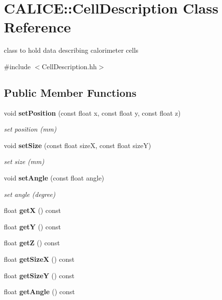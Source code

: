 \section{CALICE::CellDescription Class Reference}
\label{classCALICE_1_1CellDescription}


class to hold data describing calorimeter cells  


{\ttfamily \#include $<$CellDescription.hh$>$}\subsection*{Public Member Functions}
\begin{DoxyCompactItemize}
\item 
void {\bf setPosition} (const float x, const float y, const float z)
\begin{DoxyCompactList}\small\item\em set position (mm) \item\end{DoxyCompactList}\item 
void {\bf setSize} (const float sizeX, const float sizeY)
\begin{DoxyCompactList}\small\item\em set size (mm) \item\end{DoxyCompactList}\item 
void {\bf setAngle} (const float angle)
\begin{DoxyCompactList}\small\item\em set angle (degree) \item\end{DoxyCompactList}\item 
float {\bf getX} () const 
\item 
float {\bf getY} () const 
\item 
float {\bf getZ} () const 
\item 
float {\bf getSizeX} () const 
\item 
float {\bf getSizeY} () const 
\item 
float {\bf getAngle} () const 
\end{DoxyCompactItemize}
